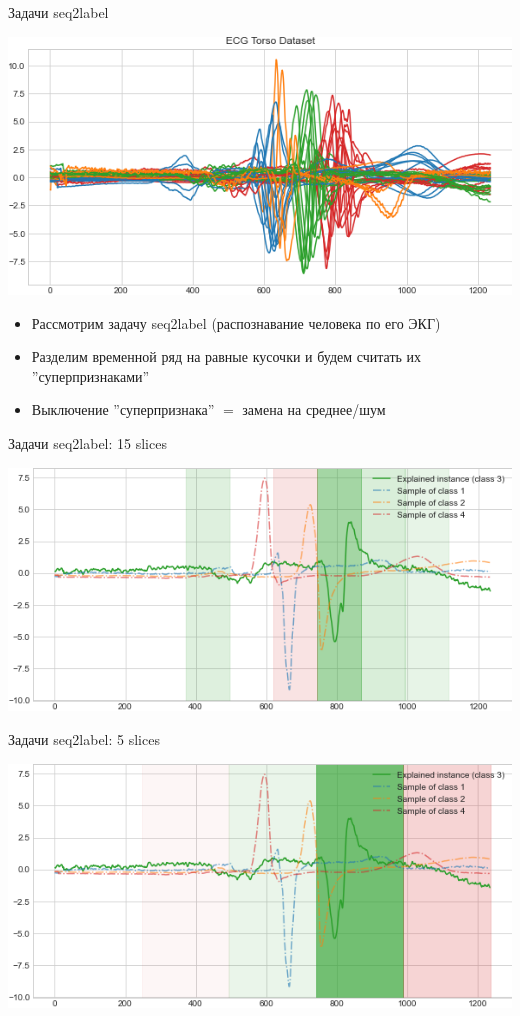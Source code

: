 \documentclass[fleqn, xcolor=x11names]{beamer}
\begin{document}
\begin{frame}{Задачи seq2label}

    \centering
    \includegraphics[width=0.7\linewidth]{all_classes.png}

    \begin{itemize}
        \item Рассмотрим задачу seq2label (распознавание человека по его ЭКГ)
        \item Разделим временной ряд на равные кусочки и будем считать их ''суперпризнаками''
        \item Выключение ''суперпризнака'' $=$ замена на среднее/шум
    \end{itemize}

\end{frame}

\begin{frame}{Задачи seq2label: 15 slices}

    \centering
    \includegraphics[width=\linewidth]{line_for_3_class_10_slices.png}

\end{frame}

\begin{frame}{Задачи seq2label: 5 slices}

    \centering
    \includegraphics[width=\linewidth]{line_for_3_class_5_slices.png}

\end{frame}
\end{document}

